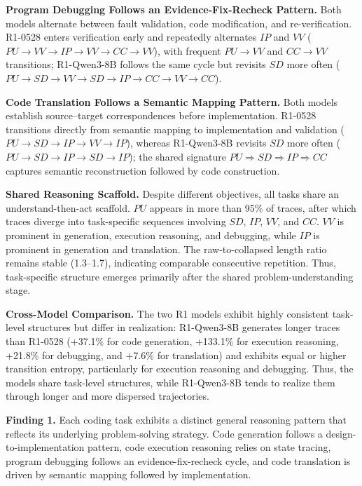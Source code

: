 \documentclass[acmsmall,screen,review,anonymous]{acmart}
\begin{document}
\textbf{Program Debugging Follows an Evidence-Fix-Recheck Pattern.}
Both models alternate between fault validation, code modification, and re-verification. R1-0528 enters verification early and repeatedly alternates \(IP\) and \(VV\) (\(PU\rightarrow VV\rightarrow IP\rightarrow VV\rightarrow CC\rightarrow VV\)), with frequent \(PU\rightarrow VV\) and \(CC\rightarrow VV\) transitions; R1-Qwen3-8B follows the same cycle but revisits \(SD\) more often (\(PU\rightarrow SD\rightarrow VV\rightarrow SD\rightarrow IP\rightarrow CC\rightarrow VV\rightarrow CC\)).

\textbf{Code Translation Follows a Semantic Mapping Pattern.}
Both models establish source--target correspondences before implementation. R1-0528 transitions directly from semantic mapping to implementation and validation (\(PU\rightarrow SD\rightarrow IP\rightarrow VV\rightarrow IP\)), whereas R1-Qwen3-8B revisits \(SD\) more often (\(PU\rightarrow SD\rightarrow IP\rightarrow SD\rightarrow IP\)); the shared signature \(PU\Rightarrow SD\Rightarrow IP\Rightarrow CC\) captures semantic reconstruction followed by code construction.

\textbf{Shared Reasoning Scaffold.}
Despite different objectives, all tasks share an understand-then-act scaffold. \(PU\) appears in more than 95\% of traces, after which traces diverge into task-specific sequences involving \(SD\), \(IP\), \(VV\), and \(CC\). \(VV\) is prominent in generation, execution reasoning, and debugging, while \(IP\) is prominent in generation and translation. The raw-to-collapsed length ratio remains stable (1.3--1.7), indicating comparable consecutive repetition. Thus, task-specific structure emerges primarily after the shared problem-understanding stage.

\textbf{Cross-Model Comparison.}
The two R1 models exhibit highly consistent task-level structures but differ in realization: R1-Qwen3-8B generates longer traces than R1-0528 (+37.1\% for code generation, +133.1\% for execution reasoning, +21.8\% for debugging, and +7.6\% for translation) and exhibits equal or higher transition entropy, particularly for execution reasoning and debugging. Thus, the models share task-level structures, while R1-Qwen3-8B tends to realize them through longer and more dispersed trajectories.


\begin{tcolorbox}[width=\linewidth, boxrule=0.8pt, left=2pt, right=2pt, top=2pt, bottom=2pt, colback=gray!10, colframe=black]
\textbf{Finding 1.}
Each coding task exhibits a distinct general reasoning pattern that reflects its underlying problem-solving strategy. Code generation follows a design-to-implementation pattern, code execution reasoning relies on state tracing, program debugging follows an evidence-fix-recheck cycle, and code translation is driven by semantic mapping followed by implementation.
\end{tcolorbox}
\end{document}
